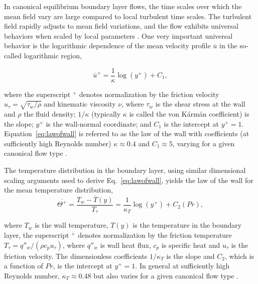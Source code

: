 In canonical equilibrium boundary layer flows, the time scales over which the mean field vary are large compared to local turbulent time scales. The turbulent field rapidly adjusts to mean field variations, and the flow exhibits universal behaviors when scaled by local parameters \cite{townsend1976}. One very important universal behavior is the logarithmic dependence of the mean velocity profile $\overline{u}$ in the so-called logarithmic region,

\begin{equation}
{\overline u^+}=\frac{1}{\kappa}\log(y^+)+C_1, \label{eq:lawofwall}
\end{equation}

\noindent  where the superscript $^+$ denotes normalization by the friction velocity $u_\tau = \sqrt{\tau_w / \rho}$ and kinematic viscosity $\nu$, where $\tau_w$ is the shear stress at the wall and $\rho$ the fluid density; $1/\kappa$ (typically $\kappa$ is called the von K\'{a}rm\'{a}n coefficient) is the slope; $y^+$ is the wall-normal coordinate; and $C_1$ is the intercept at $y^+ = 1$. Equation~\ref{eq:lawofwall} is referred to as the law of the wall with coefficients (at sufficiently high Reynolds number) $\kappa\approx0.4$ and $C_1\approx5$, varying for a given canonical flow type \cite{Nagib2008}. 

The temperature distribution in the boundary layer, using similar dimensional scaling arguments used to derive Eq.~\ref{eq:lawofwall}, yields the law of the wall for the mean temperature distribution,
\begin{equation}
{\overline{\Theta^+ }} =  \frac{\overline{T_w - T(y)}}{T_\tau} =\frac{1}{\kappa_T}\log(y^+)+C_2(Pr), \label{eq:lawofwallT}
\end{equation}

\noindent \noindent  where $T_w$ is the wall temperature, $T(y)$ is the temperature in the boundary layer, the superscript $^+$ denotes normalization by the friction temperature $T_\tau = q''_w / (\rho c_p u_{\tau} )$, where $q''_w$ is wall heat  flux, $c_p$ is specific heat and $u_\tau$ is the friction velocity. The dimensionless coefficients $1/\kappa_T$ is the slope and $C_2$, which is a function of $Pr$, is the intercept at $y^+ = 1$. In general at sufficiently high Reynolds number, $\kappa_T \approx 0.48$ but also varies for a given canonical flow type \cite{kader1972}.

